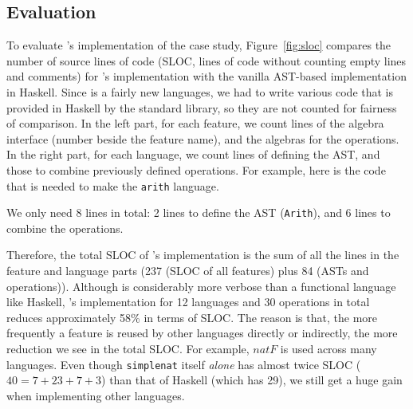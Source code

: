
\subsection{Evaluation}

To evaluate \name's implementation of the case study, Figure~\ref{fig:sloc}
compares the number of source lines of code (SLOC, lines of code without
counting empty lines and comments) for \name's implementation with the vanilla
AST-based implementation in Haskell. Since \name is a fairly new languages, we
had to write various code that is provided in Haskell by the standard library,
so they are not counted for fairness of comparison. In the left part, for each
feature, we count lines of the algebra interface (number beside the feature
name), and the algebras for the operations. In the right part, for each
language, we count lines of defining the AST, and those to combine previously
defined operations. For example, here is the code that is needed to make the
\lstinline{arith} language.


\noindent We only need 8 lines in total: 2 lines to define the AST
(\lstinline{Arith}), and 6 lines to combine the operations.

Therefore, the total SLOC of \name's implementation is the sum of all the
lines in the feature and language parts (237 (SLOC of all features) plus 84
(ASTs and operations)). Although \name is considerably more verbose than a
functional language like Haskell, \name's implementation for 12 languages and 30
operations in total reduces approximately 58\% in terms of SLOC. The reason is
that, the more frequently a feature is reused by other languages directly or
indirectly, the more reduction we see in the total SLOC. For example,
$\mathit{natF}$ is used across many languages. Even though \lstinline{simplenat}
itself \textit{alone} has almost twice SLOC ($40 = 7+23+7+3$) than that of Haskell (which
has 29), we still get a huge gain when implementing other languages.



